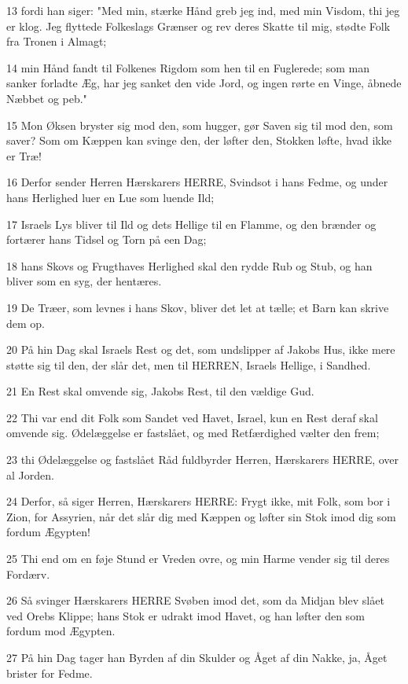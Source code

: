\par 13 fordi han siger: "Med min, stærke Hånd greb jeg ind, med min Visdom, thi jeg er klog. Jeg flyttede Folkeslags Grænser og rev deres Skatte til mig, stødte Folk fra Tronen i Almagt;
\par 14 min Hånd fandt til Folkenes Rigdom som hen til en Fuglerede; som man sanker forladte Æg, har jeg sanket den vide Jord, og ingen rørte en Vinge, åbnede Næbbet og peb."
\par 15 Mon Øksen bryster sig mod den, som hugger, gør Saven sig til mod den, som saver? Som om Kæppen kan svinge den, der løfter den, Stokken løfte, hvad ikke er Træ!
\par 16 Derfor sender Herren Hærskarers HERRE, Svindsot i hans Fedme, og under hans Herlighed luer en Lue som luende Ild;
\par 17 Israels Lys bliver til Ild og dets Hellige til en Flamme, og den brænder og fortærer hans Tidsel og Torn på een Dag;
\par 18 hans Skovs og Frugthaves Herlighed skal den rydde Rub og Stub, og han bliver som en syg, der hentæres.
\par 19 De Træer, som levnes i hans Skov, bliver det let at tælle; et Barn kan skrive dem op.
\par 20 På hin Dag skal Israels Rest og det, som undslipper af Jakobs Hus, ikke mere støtte sig til den, der slår det, men til HERREN, Israels Hellige, i Sandhed.
\par 21 En Rest skal omvende sig, Jakobs Rest, til den vældige Gud.
\par 22 Thi var end dit Folk som Sandet ved Havet, Israel, kun en Rest deraf skal omvende sig. Ødelæggelse er fastslået, og med Retfærdighed vælter den frem;
\par 23 thi Ødelæggelse og fastslået Råd fuldbyrder Herren, Hærskarers HERRE, over al Jorden.
\par 24 Derfor, så siger Herren, Hærskarers HERRE: Frygt ikke, mit Folk, som bor i Zion, for Assyrien, når det slår dig med Kæppen og løfter sin Stok imod dig som fordum Ægypten!
\par 25 Thi end om en føje Stund er Vreden ovre, og min Harme vender sig til deres Fordærv.
\par 26 Så svinger Hærskarers HERRE Svøben imod det, som da Midjan blev slået ved Orebs Klippe; hans Stok er udrakt imod Havet, og han løfter den som fordum mod Ægypten.
\par 27 På hin Dag tager han Byrden af din Skulder og Åget af din Nakke, ja, Åget brister for Fedme.
